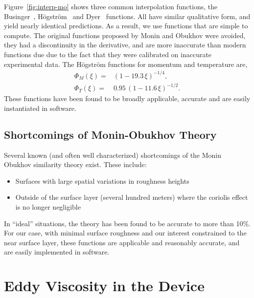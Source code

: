 Figure~\ref{fig:interp-mo} shows three common interpolation  
functions, the Businger~\cite{businger1971flux},
H{\"o}gstr{\"o}m~\cite{hogstrom1988non} and Dyer~\cite{dyer1974review}
functions. All have similar qualitative form,   
and yield nearly identical predictions. As a result, we use functions
that are simple to compute. The original functions 
proposed by Monin and Obukhov were avoided, they had a discontinuity in
the derivative, and are more inaccurate than modern functions due due to
the fact that they were calibrated on inaccurate experimental data. The
H{\"o}gstr{\"o}m functions for momentum and temperature are, 
\begin{eqnarray}
  \Phi_M(\xi) =& (1-19.3 \, \xi)^{-1/4}, \\
  \Phi_T(\xi) =& 0.95 \, (1-11.6 \,\xi)^{-1/2}.
\end{eqnarray}
These functions have been found to be broadly applicable, accurate and 
are easily instantiated in software. 

\subsection{Shortcomings of Monin-Obukhov Theory}

Several known (and often well characterized) shortcomings of the Monin
Obukhov similarity theory exist. These include:
 
\begin{itemize}
 \item Surfaces with large spatial variations in roughness heights
 \item Outside of the surface layer (several hundred meters) where the 
       coriolis effect is no longer negligible
\end{itemize}

In ``ideal'' situations, the theory has been found to be
accurate to more than 10\%\cite{QJ:QJ49709741204,kaimal}. 
For our case, with minimal surface roughness and our interest
constrained to the near surface layer, these functions are applicable
and reasonably accurate\cite{Foken2006}, and are easily implemented in
software.  

\section{Eddy Viscosity in the Device}

